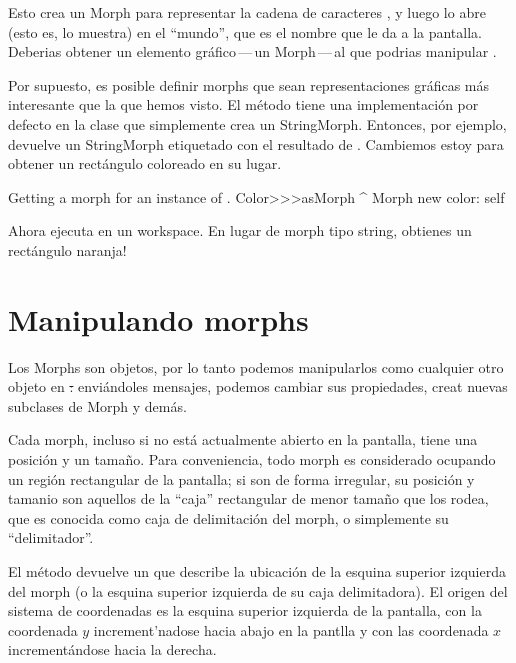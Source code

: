 \documentclass[a4paper,10pt,twoside]{book}
\begin{document}
Esto crea un Morph para representar la cadena de caracteres , y luego lo abre (esto es, lo muestra) en el ``mundo'', que es el nombre que \pharo le da a la pantalla.
Deberias obtener un elemento gráfico\,---\,un Morph\,---\,al que podrias manipular .

Por supuesto, es posible definir morphs que sean representaciones gr\'aficas  m\'as interesante que la que hemos visto.
El m\'etodo  tiene una implementaci\'on por defecto en la clase   que simplemente crea un StringMorph.
Entonces, por ejemplo,  devuelve un StringMorph etiquetado con el resultado de  .
Cambiemos estoy para obtener un rect\'angulo coloreado en su lugar.


\begin{method}{Getting a morph for an instance of .}
Color>>>asMorph
	^ Morph new color: self
\end{method}
\noindent
Ahora ejecuta   en un workspace. En lugar de morph tipo string, obtienes un rect\'angulo naranja!



\section{Manipulando morphs}

Los Morphs son objetos, por lo tanto podemos manipularlos como cualquier otro objeto en \st: envi\'andoles mensajes, podemos cambiar sus propiedades, creat nuevas subclases de Morph y demás.

Cada morph, incluso si no est\'a actualmente abierto en la pantalla, tiene una posición y un tamaño.
Para conveniencia, todo morph es considerado ocupando un regi\'on rectangular de la pantalla; si son de forma irregular, su posici\'on y tamanio son aquellos de la ``caja'' rectangular de menor tamaño que los rodea, que es conocida como caja de delimitaci\'on del morph, o simplemente su ``delimitador''.


El método  devuelve un  que describe la ubicaci\'on de la esquina superior izquierda del morph  (o la esquina superior izquierda de su caja delimitadora).
El origen del sistema de coordenadas es la esquina superior izquierda de la pantalla, con la coordenada $y$  increment'nadose hacia abajo en la pantlla y con las coordenada $x$ increment\'andose hacia la derecha.
\end{document}
